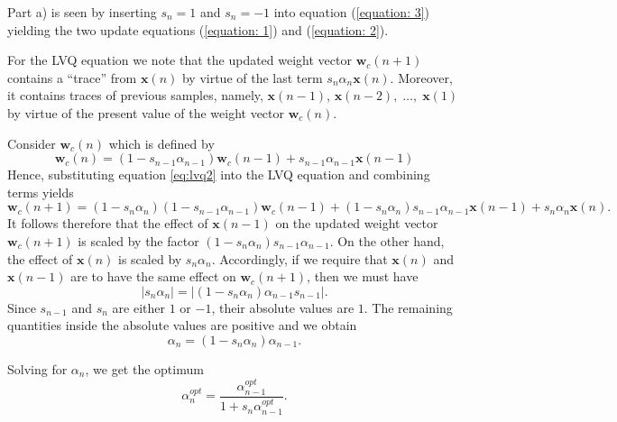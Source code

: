 \begin{enumerate}
  \begin{solution}
    
    Part a) is seen by inserting $s_n=1$ and $s_n=-1$ into equation (\ref{equation: 3}) yielding the two
    update equations (\ref{equation: 1}) and (\ref{equation: 2}).

    For the LVQ equation we note that the updated weight vector
    $\mathbf{w}_c(n+1)$ contains a ``trace'' from  $\mathbf{x}(n)$ by
    virtue of the last term $s_n\alpha_n\mathbf{x}(n)$. Moreover, it
    contains traces of previous samples, namely, $\mathbf{x}(n-1)$,
    $\mathbf{x}(n-2),\;\ldots,\; \mathbf{x}(1)$ by virtue of the present
    value of the weight vector $\mathbf{w}_c(n)$.

    Consider $\mathbf{w}_c(n)$ which is defined by
    \begin{equation}
      \mathbf{w}_c(n)=(1-s_{n-1}\alpha_{n-1})\mathbf{w}_c(n-1)+s_{n-1}\alpha_{n-1}\mathbf{x}(n-1)
      \label{eq:lvq2}
    \end{equation}
    Hence, substituting equation \ref{eq:lvq2} into the LVQ equation and
    combining terms yields
    \begin{equation}
      \mathbf{w}_c(n+1)=(1-s_n\alpha_n)(1-s_{n-1}\alpha_{n-1})\mathbf{w}_c(n-1)+(1-s_n\alpha_n)s_{n-1}\alpha_{n-1}\mathbf{x}(n-1)+s_n\alpha_n\mathbf{x}(n).
      \label{eq:lvq3}
    \end{equation}
    It follows therefore that the effect of $\mathbf{x}(n-1)$ on the
    updated weight vector $\mathbf{w}_c(n+1)$ is scaled by the factor
    $(1-s_n\alpha_n) s_{n-1} \alpha_{n-1}$. On the other hand, the effect of
    $\mathbf{x}(n)$ is scaled by $s_n\alpha_n$. Accordingly, if we require
    that $\mathbf{x}(n)$ and $\mathbf{x}(n-1)$ are to have the same effect
    on $\mathbf{w}_c(n+1)$, then we must have
    \begin{equation*}
      | s_n \alpha_n |= | (1-s_n\alpha_n)\alpha_{n-1} s_{n-1} |.
    \end{equation*}
    Since $s_{n-1}$ and $s_n$ are either $1$ or $-1$, their absolute values are $1$. The remaining quantities inside
    the absolute values are positive and we obtain
    \begin{equation*}
      \alpha_n = (1-s_n\alpha_n)\alpha_{n-1} .
    \end{equation*}

    Solving for $\alpha_n$, we get the optimum
    \begin{equation*}
      \alpha_n^{opt}=\frac{\alpha_{n-1}^{opt}}{1+s_n\alpha_{n-1}^{opt}}.
    \end{equation*}




\end{solution}
\end{enumerate}
